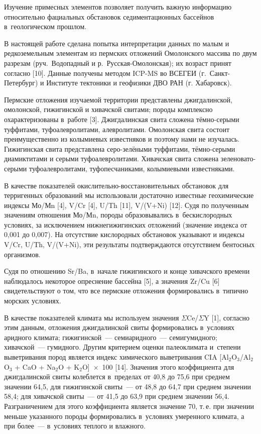  

\makeProcTitleRazdel
{}

Изучение примесных элементов позволяет получить важную информацию относительно фациальных обстановок седиментационных бассейнов в~геологическом прошлом.

В настоящей работе сделана попытка интерпретации данных по малым и редкоземельным элементам из пермских отложений Омолонского массива по двум разрезам (руч.~Водопадный и р.~Русская-Омолонская); их возраст принят согласно [10]. Данные получены методом ICP-MS во ВСЕГЕИ (г.~Санкт-Петербург) и Институте тектоники и геофизики ДВО РАН (г. Хабаровск).

Пермские отложения изучаемой территории представлены джигдалинской, омолонской, гижигинской и хивачской свитами; породы комплексно охарактеризованы в~работе [3]. Джигдалинская свита сложена тёмно-серыми туффитами, туфоалевролитами, алевролитами. Омолонская свита состоит преимущественно из колымиевых известняков и поэтому нами не изучалась. Гижигинская свита представлена серо-зелёными туффитами, тёмно-серыми диамиктитами и серыми туфоалевролитами. Хивачская свита сложена зеленовато-серыми туфоалевролитами, туфопесчаниками, колымиевыми известняками.

В качестве показателей окислительно-восстановительных обстановок для терригенных образований мы использовали достаточно известные геохимические индексы Мо/Мn [4], V/Cr [4], U/Th [11], V/(V+Ni) [12]. Судя по полученным значениям отношения Мо/Мn, породы образовывались в~бескислородных условиях, за исключением нижнегижигинских отложений (значение индекса от 0,001 до 0,007). На отсутствие кислородных обстановок указывают и индексы V/Cr, U/Th, V/(V+Ni), эти результаты подтверждаются отсутствием
бентосных организмов.

Судя по отношению Sr/Ba, в~начале гижигинского и конце хивачского времени наблюдалось некоторое опреснение бассейна [5], а значения Zr/Cu [6] свидетельствуют о том, что все пермские отложения формировались в~типично морских условиях.

В качестве показателей климата мы используем значения $\Sigma$Ce/$\Sigma$Y [1], согласно этим данным, отложения джигдалинской свиты формировались в~условиях аридного климата; гижигинской~--- семиаридного~--- семигумидного; хивачской~--- гумидного. Другим критерием оценки палеоклимата и~степени выветривания пород является индекс химического выветривания CIA [Al$_{2}$O$_{3}$/Al$_{2}$O$_{3}$ + CaO + Na$_{2}$O + K$_{2}$O]~$\times$~100 [14]. Значения этого коэффициента для джигдалинской свиты колеблется в~пределах от 40,8 до 75,6 при среднем значении 64,5, для гижигинской свиты~--- от 48,8 до 64,7 при среднем значении 58,4; для хивачской свиты~--- от 41,5 до 63,9 при среднем значении 56,4. \enlargethispage{\baselineskip}Разграничением для этого коэффициента является значение 70, т.\,е. при значении меньше указанного породы формировались в~условиях умеренного климата, а при более~--- в~условиях теплого и влажного.


